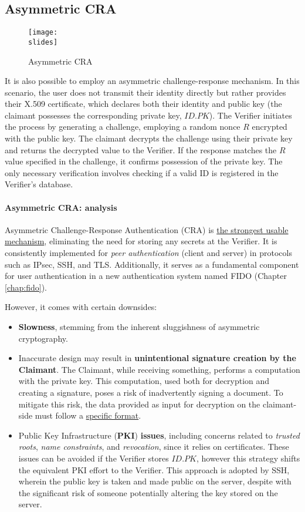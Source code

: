 \subsection{Asymmetric CRA}
\begin{figure}[h]
  \centering
  \texttt{[image: \\slides]}
  \caption{Asymmetric CRA}
\end{figure}
It is also possible to employ an asymmetric challenge-response mechanism. In this scenario, the user does not transmit their identity directly but rather provides their X.509 certificate, which declares both their identity and public key (the claimant possesses the corresponding private key, $ID.PK$). The Verifier initiates the process by generating a challenge, employing a random nonce \(R\) encrypted with the public key. The claimant decrypts the challenge using their private key and returns the decrypted value to the Verifier. If the response matches the \(R\) value specified in the challenge, it confirms possession of the private key. The only necessary verification involves checking if a valid ID is registered in the Verifier's database.

\paragraph{Asymmetric CRA: analysis}
Asymmetric Challenge-Response Authentication (CRA) is \ul{the strongest usable mechanism}, eliminating the need for storing any secrets at the Verifier. It is consistently implemented for \textit{peer authentication} (client and server) in protocols such as IPsec, SSH, and TLS.
Additionally, it serves as a fundamental component for user authentication in a new authentication system named FIDO (Chapter \ref{chap:fido}).

However, it comes with certain downsides:
\begin{itemize}
  \item \textbf{Slowness}, stemming from the inherent sluggishness of asymmetric cryptography.
  \item Inaccurate design may result in \textbf{unintentional signature creation by the Claimant}.
        The Claimant, while receiving something, performs a computation with the private key.
        This computation, used both for decryption and creating a signature, poses a risk of inadvertently signing a document. To mitigate this risk, the data provided as input for decryption on the claimant-side must follow a \underline{specific format}.
  \item Public Key Infrastructure (\textbf{PKI}) \textbf{issues}, including concerns related to \textit{trusted roots}, \textit{name constraints}, and \textit{revocation}, since it relies on certificates. These issues can be avoided if the Verifier stores \(ID.PK\), however this strategy shifts the equivalent PKI effort to the Verifier.
        This approach is adopted by SSH, wherein the public key is taken and made public on the server, despite with the significant risk of someone potentially altering the key stored on the server.
\end{itemize}


